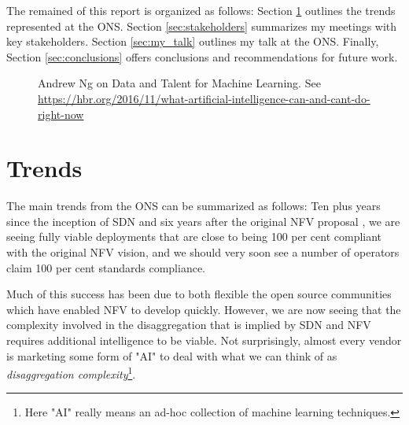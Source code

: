 \documentclass[11pt, oneside]{article}   	%
\begin{document}
\bigskip
\noindent
The remained of this report is organized as follows: Section \ref{sec:trends} outlines the trends represented at the ONS. Section \ref{sec:stakeholders} summarizes  my meetings with key stakeholders. Section \ref{sec:my_talk} outlines my talk at the ONS. Finally, Section \ref{sec:conclusions} offers conclusions and recommendations for future work.

\begin{figure}
\caption{Andrew Ng on Data and Talent for Machine Learning. See \\
\url{https://hbr.org/2016/11/what-artificial-intelligence-can-and-cant-do-right-now}}
\label{fig:talent_and_data}
\end{figure}

\section{Trends} 
\label{sec:trends}
The main trends from the ONS can be summarized as follows: Ten plus years since the inception of SDN and six years after the original NFV proposal \cite{nfv}, we are seeing fully viable deployments that are close to being 100 per cent compliant with the original NFV vision, and we should very soon see a number of operators claim 100 per cent standards compliance. 

\bigskip
\noindent
Much of this success has been due to both flexible the open source communities which have enabled NFV to develop quickly. However, we are now seeing that the complexity involved in the disaggregation that is implied by SDN and NFV requires additional intelligence to be viable. Not surprisingly, almost every vendor is marketing some form of "AI" to deal with what we can think of as \emph{disaggregation complexity}\footnote{Here "AI" really means an ad-hoc collection of machine learning techniques.}.
\end{document}
